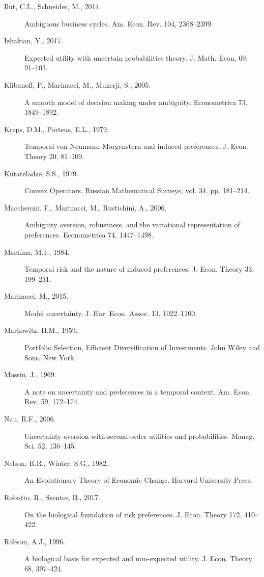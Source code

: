 \documentclass[12pt,a4paper]{article}
\newenvironment{original}
  {\par\noindent\color{black}\smallskip}
  {\par\smallskip}
\begin{document}
\begin{original}
\begin{description}
\item[Ilut, C.L., Schneider, M., 2014.] Ambiguous business cycles. Am. Econ. Rev. 104, 2368--2399.

\item[Izhakian, Y., 2017.] Expected utility with uncertain probabilities theory. J. Math. Econ. 69, 91--103.

\item[Klibanoff, P., Marinacci, M., Mukerji, S., 2005.] A smooth model of decision making under ambiguity. Econometrica 73, 1849--1892.

\item[Kreps, D.M., Porteus, E.L., 1979.] Temporal von Neumann-Morgenstern and induced preferences. J. Econ. Theory 20, 81--109.

\item[Kutateladze, S.S., 1979.] Convex Operators. Russian Mathematical Surveys, vol. 34, pp. 181--214.

\item[Maccheroni, F., Marinacci, M., Rustichini, A., 2006.] Ambiguity aversion, robustness, and the variational representation of preferences. Econometrica 74, 1447--1498.

\item[Machina, M.J., 1984.] Temporal risk and the nature of induced preferences. J. Econ. Theory 33, 199--231.

\item[Marinacci, M., 2015.] Model uncertainty. J. Eur. Econ. Assoc. 13, 1022--1100.

\item[Markowitz, H.M., 1959.] Portfolio Selection, Efficient Diversification of Investments. John Wiley and Sons, New York.

\item[Mossin, J., 1969.] A note on uncertainty and preferences in a temporal context. Am. Econ. Rev. 59, 172--174.

\item[Nau, R.F., 2006.] Uncertainty aversion with second-order utilities and probabilities. Manag. Sci. 52, 136--145.

\item[Nelson, R.R., Winter, S.G., 1982.] An Evolutionary Theory of Economic Change. Harvard University Press.

\item[Robatto, R., Szentes, B., 2017.] On the biological foundation of risk preferences. J. Econ. Theory 172, 410--422.

\item[Robson, A.J., 1996.] A biological basis for expected and non-expected utility. J. Econ. Theory 68, 397--424.


\end{description}
\end{original}
\end{document}
